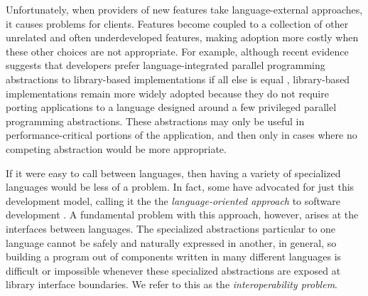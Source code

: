 Unfortunately, when providers of new features take language-external approaches, it causes problems for clients. Features become coupled to a collection of other unrelated and often underdeveloped features, making adoption more costly when these other choices are not appropriate. For example, although recent evidence suggests that developers prefer language-integrated parallel programming abstractions to library-based implementations if all else is equal \cite{langvslib}, library-based implementations remain more widely adopted because they do not require porting applications to a language designed around a few privileged parallel programming abstractions. These abstractions may only be useful in performance-critical portions of the application, and then only in cases where no competing abstraction would be more appropriate. 



If it were easy to call between languages, then having a variety of specialized languages would be less of a problem. In fact, some have advocated for just this development model, calling it the the \emph{language-oriented approach} to software development \cite{languageoriented}. A fundamental problem with this approach, however, arises at the interfaces between languages. The specialized abstractions particular to one language cannot be safely and naturally expressed in another, in general, so building a program out of components written in many different languages is difficult or impossible whenever these specialized abstractions are exposed at library interface boundaries. We refer to this as the \emph{interoperability problem}. 

